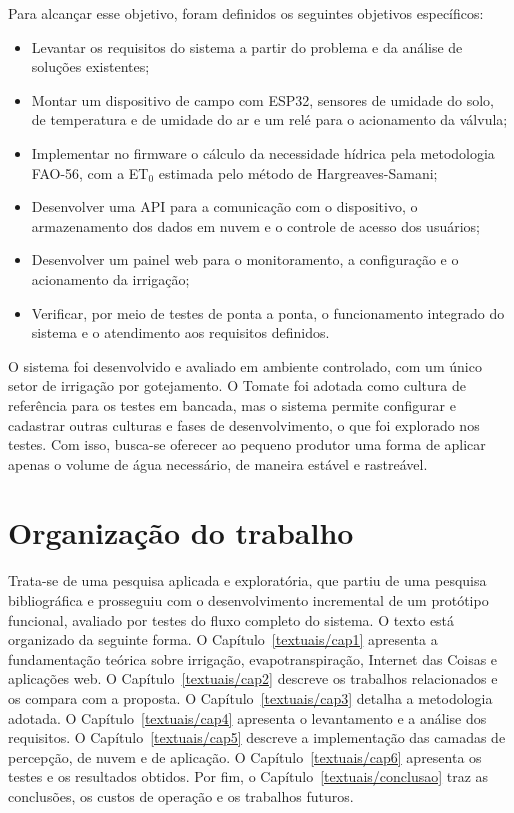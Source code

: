 Para alcançar esse objetivo, foram definidos os seguintes objetivos específicos:
\begin{itemize}
  \item Levantar os requisitos do sistema a partir do problema e da análise de soluções existentes;
  \item Montar um dispositivo de campo com ESP32, sensores de umidade do solo, de temperatura e de umidade do ar e um relé para o acionamento da válvula;
  \item Implementar no firmware o cálculo da necessidade hídrica pela metodologia FAO-56, com a ET$_0$ estimada pelo método de Hargreaves-Samani;
  \item Desenvolver uma API para a comunicação com o dispositivo, o armazenamento dos dados em nuvem e o controle de acesso dos usuários;
  \item Desenvolver um painel web para o monitoramento, a configuração e o acionamento da irrigação;
  \item Verificar, por meio de testes de ponta a ponta, o funcionamento integrado do sistema e o atendimento aos requisitos definidos.
\end{itemize}

O sistema foi desenvolvido e avaliado em ambiente controlado, com um único setor de irrigação por gotejamento. O Tomate foi adotada como cultura de referência para os testes em bancada, mas o sistema permite configurar e cadastrar outras culturas e fases de desenvolvimento, o que foi explorado nos testes. Com isso, busca-se oferecer ao pequeno produtor uma forma de aplicar apenas o volume de água necessário, de maneira estável e rastreável.

\section{Organização do trabalho}

Trata-se de uma pesquisa aplicada e exploratória, que partiu de uma pesquisa bibliográfica e prosseguiu com o desenvolvimento incremental de um protótipo funcional, avaliado por testes do fluxo completo do sistema. O texto está organizado da seguinte forma. O Capítulo~\ref{textuais/cap1} apresenta a fundamentação teórica sobre irrigação, evapotranspiração, Internet das Coisas e aplicações web. O Capítulo~\ref{textuais/cap2} descreve os trabalhos relacionados e os compara com a proposta. O Capítulo~\ref{textuais/cap3} detalha a metodologia adotada. O Capítulo~\ref{textuais/cap4} apresenta o levantamento e a análise dos requisitos. O Capítulo~\ref{textuais/cap5} descreve a implementação das camadas de percepção, de nuvem e de aplicação. O Capítulo~\ref{textuais/cap6} apresenta os testes e os resultados obtidos. Por fim, o Capítulo~\ref{textuais/conclusao} traz as conclusões, os custos de operação e os trabalhos futuros.
